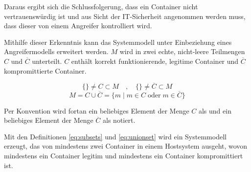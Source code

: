 \documentclass[../main.tex]{subfiles}
\begin{document}
    Daraus ergibt sich die Schlussfolgerung, dass ein Container nicht vertrauenswürdig ist und aus Sicht der IT-Sicherheit angenommen werden muss, dass dieser von einem Angreifer kontrolliert wird.

    Mithilfe dieser Erkenntnis kann das Systemmodell unter Einbeziehung eines Angreifermodells erweitert werden. \(M\) wird in zwei echte, nicht-leere Teilmengen \(C\) und \(\overline{C}\) unterteilt. \(C\) enthält korrekt funktionierende, legitime Container und \(\overline{C}\) kompromittierte Container.

    \begin{equation}
    \label{eq:subsets}
      \{\}\neq C \subset M \quad,\quad \{\}\neq \overline{C} \subset M %
    \end{equation}
    \begin{equation}
    \label{eq:unionset}
      M = C \cup \overline{C} = \{m \; | \; m\in C \; \text{oder} \; m\in \overline{C}\}
    \end{equation}

    Per Konvention wird fortan ein beliebiges Element der Menge \(C\) als \cvalid{} und ein beliebiges Element der Menge \(\overline{C}\) als \cbroken{} notiert.


    Mit den Definitionen \ref{eq:subsets} und \ref{eq:unionset} wird ein Systemmodell erzeugt, das von mindestens zwei Container in einem Hostsystem ausgeht, wovon mindestens ein Container \cvalid{} legitim und mindestens ein Container \cbroken{} kompromittiert ist.
\end{document}
